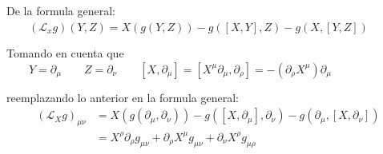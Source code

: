 \documentclass{article}
\begin{document}
De la formula general: $ \qquad (\mathcal{L}_x g)(Y,Z) = X(g(Y,Z)) - g([X,Y],Z) - g(X,[Y,Z]) $

\hfill 

Tomando en cuenta que $ \qquad Y = \partial_\mu \qquad Z = \partial_\nu \qquad [X,\partial_\mu] = [X^\mu\partial_\mu, \partial_\rho] = - (\partial_\rho X^\mu)\partial_\mu $

\hfill 

reemplazando lo anterior en la formula general: 
\begin{align*}
  (\mathcal{L}_X g) _{\mu\nu} &= X(g(\partial_\mu, \partial_\nu)) - g([X,\partial_\mu],\partial_\nu) - g(\partial_\mu, [X,\partial_\nu]) \\
                &= X ^ {\rho} \partial_\rho g _{\mu\nu}  + \partial_\rho X ^ {\mu} g _{\mu\nu} + \partial_\nu X ^ {\rho} g _{\mu\rho} 
\end{align*}
\end{document}
